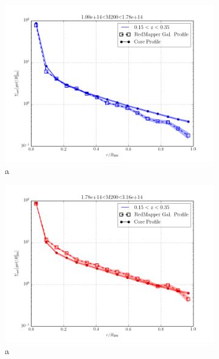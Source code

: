 \documentclass[twocolumn]{article}
\begin{document}
\begin{figure}
  \begin{subfigure}{.5\textwidth}
    \centering\includegraphics[width=1.0\linewidth]{figs/cfn/basic_rd.param/plot_zmrs.py/fig2.png}
    \caption{a}
  \end{subfigure}
  \begin{subfigure}{.5\textwidth}
    \centering\includegraphics[width=1.0\linewidth]{figs/cfn/basic_rd.param/plot_zmrs.py/fig3.png}
    \caption{a}
  \end{subfigure}
  \begin{subfigure}{.5\textwidth}

\end{subfigure}
\end{figure}
\end{document}
